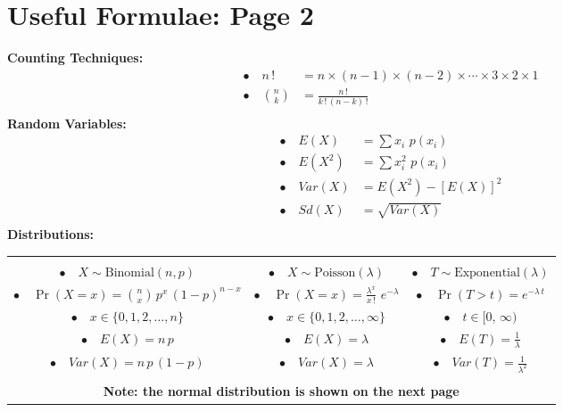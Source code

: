 \documentclass[12pt]{article}
\begin{document}
\newpage

\section*{Useful Formulae: Page 2\\[0.3cm]}
{\bf Counting Techniques:}\\[-0.8cm]
\begin{align*}
\bullet\quad n\,! &= n\times(n-1)\times(n-2)\times\cdots\times3\times2\times 1\\[0.6cm]
\bullet\quad \binom{n}{k} &= \frac{n\,!}{k\,! \,(n-k)\,!}\\
\end{align*}
{\bf Random Variables:}\\[-0.8cm]
\begin{align*}
\bullet\quad E(X) &= \sum x_i \,\, p(x_i)\\[0.6cm]
\bullet\quad E(X^2) &= \sum x_i^2 \,\, p(x_i)\\[0.6cm]
\bullet\quad Var(X) &= E(X^2) - [E(X)]^2\\[0.6cm]
\bullet\quad Sd(X) &= \sqrt{Var(X)}\\
\end{align*}
{\bf Distributions:}\\[-0.0cm]
\begin{adjustwidth}{-2.1cm}{0cm}
\begin{tabular}{|c@{\quad}|c@{\quad}|c@{\quad}|}
\hline
&&\\[-0.3cm]
$\bullet\quad X \sim \text{Binomial}(n,p)$ & $\bullet\quad X \sim \text{Poisson}(\lambda)$ & $\bullet\quad T \sim \text{Exponential}(\lambda)$ \\[0.6cm]
${\displaystyle\bullet\quad \Pr(X=x) = \binom{n}{x}\,p^x\,(1-p)^{n-x}}$ & ${\displaystyle\bullet\quad \Pr(X=x) = \frac{\lambda^x}{x\,!}\,\,e^{-\lambda}}$ & $\bullet\quad \Pr(T>t) = e^{-\lambda\,t}$ \\[0.8cm]
$\bullet\quad x \in \{0,1,2,\ldots,n\}$ & $\bullet\quad x \in \{0,1,2,\ldots,\infty\}$ & $\bullet\quad t \in [0,\,\infty)$ \\[0.8cm]
$\bullet\quad E(X) = n\,p$ & $\bullet\quad E(X) = \lambda$ & ${\displaystyle\bullet\quad E(T) = \frac{1}{\lambda}}$ \\[0.8cm]
$\bullet\quad Var(X) = n\,p\,(1-p)$ & $\bullet\quad Var(X) = \lambda$ & ${\displaystyle\bullet\quad Var(T) = \frac{1}{\lambda^2}}$ \\[0.4cm]
\hline
\multicolumn{3}{c}{}\\
\multicolumn{3}{c}{{\bf Note: the normal distribution is shown on the next page}}
\end{tabular}
\end{adjustwidth}
\end{document}
